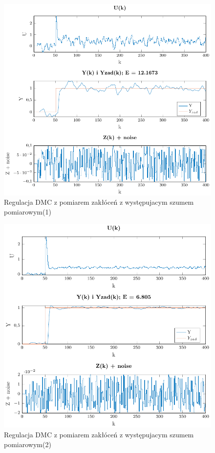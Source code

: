 \documentclass[a4paper,titlepage,11pt,twosides,floatssmall]{mwrep}
\begin{document}
\begin{figure}[H]
	\centering
	\includegraphics[scale=0.85]{../../Lab2/PDF_rysunki/Z7_Szum1.pdf}
	\caption{Regulacja DMC z pomiarem zakłóceń z występujacym szumem pomiarowym(1)}
	\label{szum1}
\end{figure}

\begin{figure}[h]
	\centering
	\includegraphics[scale=0.85]{../../Lab2/PDF_rysunki/Z7_Szum2.pdf}
	\caption{Regulacja DMC z pomiarem zakłóceń z występujacym szumem pomiarowym(2)}
	\label{szum2}
\end{figure}
\end{document}
